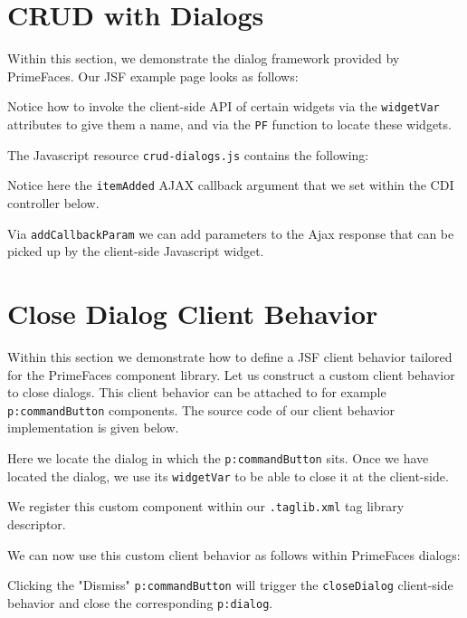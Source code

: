 \section{CRUD with Dialogs}
Within this section, we demonstrate the dialog framework provided by PrimeFaces.
Our JSF example page looks as follows:

Notice how to invoke the client-side API of certain widgets via the \texttt{widgetVar} attributes to give them a name, and via the \texttt{PF} function to locate these widgets.

The Javascript resource \texttt{crud-dialogs.js} contains the following:

Notice here the \texttt{itemAdded} AJAX callback argument that we set within the CDI controller below.


Via \texttt{addCallbackParam} we can add parameters to the Ajax response that can be picked up by the client-side Javascript widget.

\section{Close Dialog Client Behavior}
Within this section we demonstrate how to define a JSF client behavior tailored for the PrimeFaces component library.
Let us construct a custom client behavior to close dialogs.
This client behavior can be attached to for example \texttt{p:commandButton} components.
The source code of our client behavior implementation is given below.

Here we locate the dialog in which the \texttt{p:commandButton} sits.
Once we have located the dialog, we use its \texttt{widgetVar} to be able to close it at the client-side.

We register this custom component within our \texttt{.taglib.xml} tag library descriptor.


We can now use this custom client behavior as follows within PrimeFaces dialogs:

Clicking the "Dismiss" \texttt{p:commandButton} will trigger the \texttt{closeDialog} client-side behavior and close the corresponding \texttt{p:dialog}.


